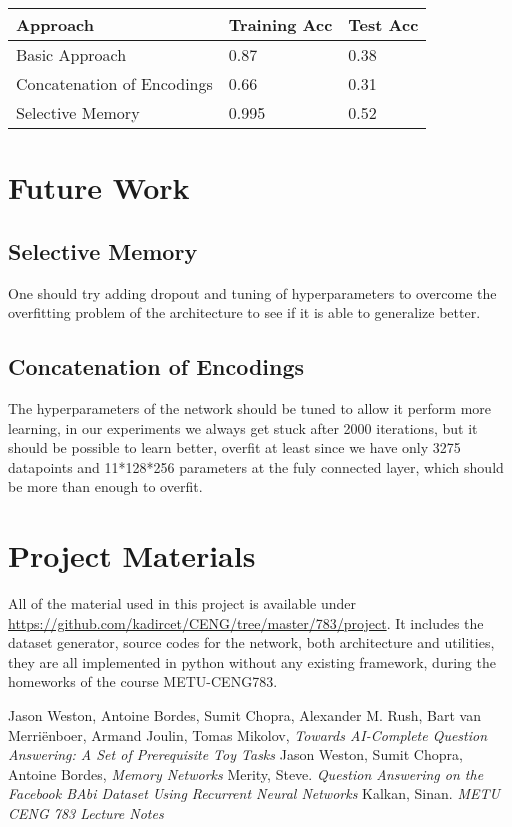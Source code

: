 \documentclass[conference,compsoc]{IEEEtran}
\begin{document}
\begin{tabular}{|l|l|l|}
  \hline
  Approach & Training Acc & Test Acc \\ \hline
  Basic Approach & 0.87 & 0.38 \\ \hline
  Concatenation of Encodings & 0.66 & 0.31 \\ \hline
  Selective Memory & 0.995 & 0.52 \\ \hline
\end{tabular}

\section{Future Work}
\subsection{Selective Memory}
One should try adding dropout and tuning of hyperparameters to overcome the overfitting
problem of the architecture to see if it is able to generalize better.

\subsection{Concatenation of Encodings}
The hyperparameters of the network should be tuned to allow it perform more learning,
in our experiments we always get stuck after 2000 iterations, but it should be possible
to learn better, overfit at least since we have only 3275 datapoints and 11*128*256 parameters
at the fuly connected layer, which should be more than enough to overfit.

\section{Project Materials}
All of the material used in this project is available under \url{https://github.com/kadircet/CENG/tree/master/783/project}.
It includes the dataset generator, source codes for the network, both architecture and utilities,
they are all implemented in python without any existing framework, during the homeworks
of the course METU-CENG783.

\pagebreak
\begin{thebibliography}{1}
Jason Weston, Antoine Bordes, Sumit Chopra, Alexander M. Rush, Bart van Merriënboer, Armand Joulin, Tomas Mikolov,
    \emph{Towards AI-Complete Question Answering: A Set of Prerequisite Toy Tasks}
Jason Weston, Sumit Chopra, Antoine Bordes, 
    \emph{Memory Networks}
    Merity, Steve. \emph{Question Answering on the Facebook BAbi Dataset Using Recurrent Neural Networks}
    Kalkan, Sinan. \emph{METU CENG 783 Lecture Notes}
\end{thebibliography}
\end{document}
